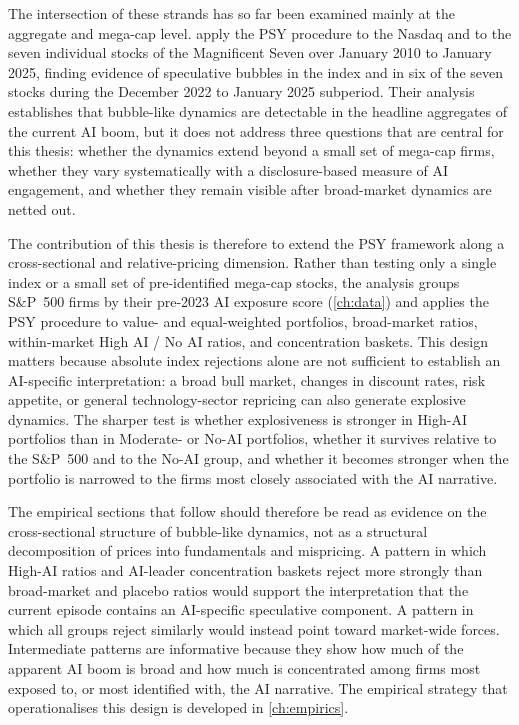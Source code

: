 The intersection of these strands has so far been examined mainly at the aggregate and mega-cap level. \citet{baselePhillipsShi2025} apply the PSY procedure to the Nasdaq and to the seven individual stocks of the Magnificent Seven over January 2010 to January 2025, finding evidence of speculative bubbles in the index and in six of the seven stocks during the December 2022 to January 2025 subperiod. Their analysis establishes that bubble-like dynamics are detectable in the headline aggregates of the current AI boom, but it does not address three questions that are central for this thesis: whether the dynamics extend beyond a small set of mega-cap firms, whether they vary systematically with a disclosure-based measure of AI engagement, and whether they remain visible after broad-market dynamics are netted out.

The contribution of this thesis is therefore to extend the PSY framework along a cross-sectional and relative-pricing dimension. Rather than testing only a single index or a small set of pre-identified mega-cap stocks, the analysis groups S\&P~500 firms by their pre-2023 AI exposure score (\cref{ch:data}) and applies the PSY procedure to value- and equal-weighted portfolios, broad-market ratios, within-market High AI / No AI ratios, and concentration baskets. This design matters because absolute index rejections alone are not sufficient to establish an AI-specific interpretation: a broad bull market, changes in discount rates, risk appetite, or general technology-sector repricing can also generate explosive dynamics. The sharper test is whether explosiveness is stronger in High-AI portfolios than in Moderate- or No-AI portfolios, whether it survives relative to the S\&P~500 and to the No-AI group, and whether it becomes stronger when the portfolio is narrowed to the firms most closely associated with the AI narrative.

The empirical sections that follow should therefore be read as evidence on the cross-sectional structure of bubble-like dynamics, not as a structural decomposition of prices into fundamentals and mispricing. A pattern in which High-AI ratios and AI-leader concentration baskets reject more strongly than broad-market and placebo ratios would support the interpretation that the current episode contains an AI-specific speculative component. A pattern in which all groups reject similarly would instead point toward market-wide forces. Intermediate patterns are informative because they show how much of the apparent AI boom is broad and how much is concentrated among firms most exposed to, or most identified with, the AI narrative. The empirical strategy that operationalises this design is developed in \cref{ch:empirics}.
